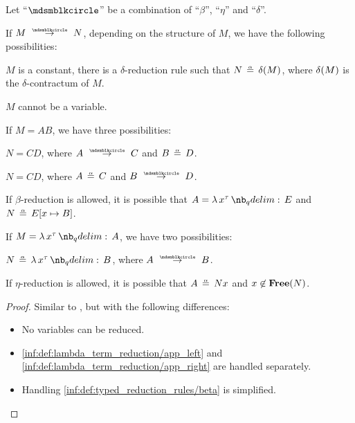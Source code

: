 \begin{lemma}\label{thm:single_step_reduction_deconstruction}
  Let \enquote{\( {\Anon} \)} be a combination of \enquote{\( \beta \)}, \enquote{\( \eta \)} and \enquote{\( \delta \)}.

  If \( M \pred N \), depending on the structure of \( M \), we have the following possibilities:
  \begin{thmenum}
     \( M \) is a constant, there is a \( \delta \)-reduction rule such that \( N \aequiv \op*{\delta}(M) \), where \( \op*{\delta}(M) \) is the \( \delta \)-contractum of \( M \).

     \( M \) cannot be a variable.

     If \( M = AB \), we have three possibilities:
    \begin{thmenum}
       \( N = CD \), where \( A \pred C \) and \( B \aequiv D \).

       \( N = CD \), where \( A \aequiv C \) and \( B \pred D \).

       If \( \beta \)-reduction is allowed, it is possible that \( A = \qabs {x^\tau} E \) and \( N \aequiv E[x \mapsto B] \).
    \end{thmenum}

     If \( M = \qabs {x^\tau} A \), we have two possibilities:
    \begin{thmenum}
       \( N \aequiv \qabs {x^\tau} B \), where \( A \pred B \).

       If \( \eta \)-reduction is allowed, it is possible that \( A \aequiv Nx \) and \( x \not\in \op*{Free}(N) \).
    \end{thmenum}
  \end{thmenum}
\end{lemma}
\begin{proof}
  Similar to , but with the following differences:
  \begin{itemize}
    \item No variables can be reduced.
    \item \ref{inf:def:lambda_term_reduction/app_left} and \ref{inf:def:lambda_term_reduction/app_right} are handled separately.
    \item Handling \ref{inf:def:typed_reduction_rules/beta} is simplified.
  \end{itemize}
\end{proof}

